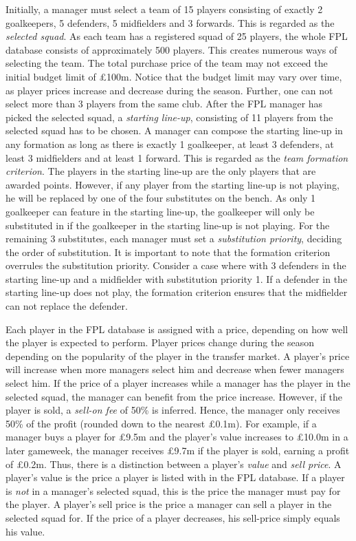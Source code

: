 \newpar

Initially, a manager must select a team of 15 players consisting of exactly 2 goalkeepers, 5 defenders, 5 midfielders and 3 forwards. This is regarded as the \textit{selected squad}. As each team has a registered squad of 25 players, the whole FPL database consists of approximately 500 players. This creates numerous ways of selecting the team. The total purchase price of the team may not exceed the initial budget limit of \pounds 100m. Notice that the budget limit may vary over time, as player prices increase and decrease during the season. Further, one can not select more than 3 players from the same club. After the FPL manager has picked the selected squad, a \textit{starting line-up}, consisting of 11 players from the selected squad has to be chosen. A manager can compose the starting line-up in any formation as long as there is exactly 1 goalkeeper, at least 3 defenders, at least 3 midfielders and at least 1 forward. This is regarded as the \textit{team formation criterion}. The players in the starting line-up are the only players that are awarded points. However, if any player from the starting line-up is not playing, he will be replaced by one of the four substitutes on the bench. As only 1 goalkeeper can feature in the starting line-up, the goalkeeper will only be substituted in if the goalkeeper in the starting line-up is not playing. For the remaining 3 substitutes, each manager must set a \textit{substitution priority}, deciding the order of substitution. It is important to note that the formation criterion overrules the substitution priority. Consider a case where with  3 defenders in the starting line-up and a midfielder with substitution priority 1. If a defender in the starting line-up does not play, the formation criterion ensures that the midfielder can not replace the defender.

\newpar

Each player in the FPL database is assigned with a price, depending on how well the player is expected to perform. Player prices change during the season depending on the popularity of the player in the transfer market. A player's price will increase when more managers select him and decrease when fewer managers select him. If the price of a player increases while a manager has the player in the selected squad, the manager can benefit from the price increase. However, if the player is sold, a \textit{sell-on fee} of 50\% is inferred. Hence, the manager only receives 50\% of the profit (rounded down to the nearest \pounds 0.1m). For example, if a manager buys a player for \pounds 9.5m and the player's value increases to \pounds 10.0m in a later gameweek, the manager receives \pounds 9.7m if the player is sold, earning a profit of \pounds 0.2m. Thus, there is a distinction between a player's \textit{value} and \textit{sell price}. A player's value is the price a player is listed with in the FPL database. If a player is \textit{not} in a manager's selected squad, this is the price the manager must pay for the player. A player's sell price is the price a manager can sell a player in the selected squad for. If the price of a player decreases, his sell-price simply equals his value.



